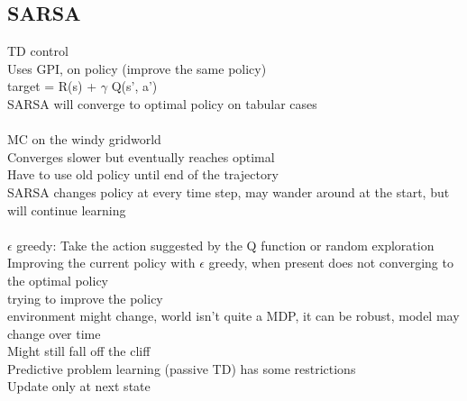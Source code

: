 \documentclass[11pt]{article}
\begin{document}
\subsection*{SARSA}
TD control\\
Uses GPI, on policy (improve the same policy)\\
target = R(s) + $\gamma$ Q(s', a')\\
SARSA will converge to optimal policy on tabular cases\\
\\
MC on the windy gridworld\\
Converges slower but eventually reaches optimal\\
Have to use old policy until end of the trajectory
\\
SARSA changes policy at every time step, may wander around at the start, but will continue learning
\\\\
$\epsilon$ greedy: Take the action suggested by the Q function or random exploration
\\
Improving the current policy with $\epsilon$ greedy, when present does not converging to the optimal policy
\\
trying to improve the policy\\
environment might change, world isn't quite a MDP, it can be robust, model may change over time \\
Might still fall off the cliff
\\
Predictive problem learning (passive TD) has some restrictions 
\\
Update only at next state
\end{document}
